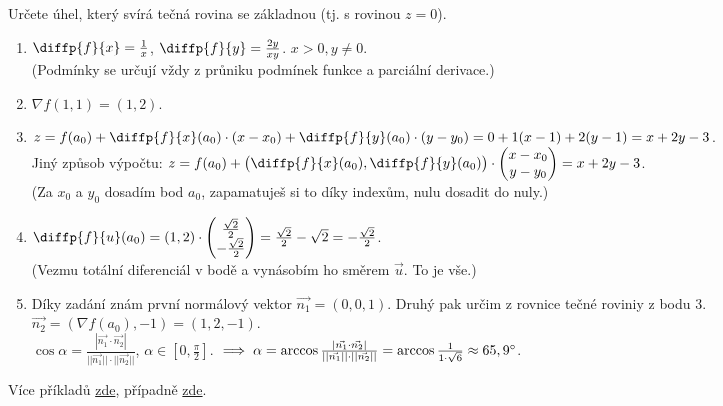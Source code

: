 \documentclass{article}
\begin{document}
    Určete úhel, který svírá tečná rovina se základnou (tj. s rovinou $z=0$).
    \begin{enumerate}
        \item $\diffp{f}{x} = \frac{1}{x} $, $\diffp{f}{y} = \frac{2y}{x y}$.
            $x > 0, y \neq 0$. \\ (Podmínky se určují vždy z průniku podmínek funkce a parciální derivace.)
        \item $\nabla f(1, 1) = (1, 2)$.
        \item $z = f(a_0) + \diffp{f}{x}(a_0) \cdot (x-x_0) + \diffp{f}{y}(a_0) \cdot (y-y_0)= 0 + 1(x-1) + 2(y-1) = x+2y-3$. \\
        Jiný způsob výpočtu: $z = f(a_0) + 
        \begin{pmatrix}
            \diffp{f}{x}(a_0), \diffp{f}{y}(a_0)
        \end{pmatrix}
        \cdot 
        \begin{pmatrix}
            x-x_0 \\           
            y-y_0
        \end{pmatrix}
        = x+2y-3$.\\
        (Za $x_0$ a $y_0$ dosadím bod $a_0$, zapamatuješ si to díky indexům, nulu dosadit do nuly.)
        \item $\diffp{f}{u}(a_0) = (1, 2) \cdot 
        \begin{pmatrix}
            \frac{\sqrt{2}}{2} \\           
            -\frac{\sqrt{2}}{2}
        \end{pmatrix} 
        = \frac{\sqrt{2}}{2} - \sqrt{2} = -\frac{\sqrt{2}}{2}$. \\
        (Vezmu totální diferenciál v bodě a vynásobím ho směrem $\vec{u}$. To je vše.)
        \item Díky zadání znám první normálový vektor $\vec{n_1} = (0, 0, 1)$. Druhý pak určim z rovnice tečné roviniy z bodu 3. $\vec{n_2} = (\nabla f(a_0), -1) = (1, 2, -1)$. \\
        $\cos{\alpha} = \frac{|\vec{n_1} \cdot \vec{n_2}|}{||{\vec{n_1}|| \cdot ||\vec{n_2}||}}$, $\alpha \in [0, \frac{\pi}{2} ]$. $\implies \alpha = \arccos{\frac{|\vec{n_1} \cdot \vec{n_2}|}{||{\vec{n_1}|| \cdot ||\vec{n_2}||}}} = \arccos{\frac{1}{1 \cdot \sqrt{6}}} \approx 65,9 \degree$.
    \end{enumerate}
    Více příkladů \href{https://math.fel.cvut.cz/en/people/korbemir/mat2/2022z/4.cviceni_mat2_2022_z.pdf}{zde}, případně \href{https://math.fel.cvut.cz/en/people/korbemir/mat2/2024z/5.cviceni_mat2_2024_z.pdf}{zde}.
    
\end{document}
